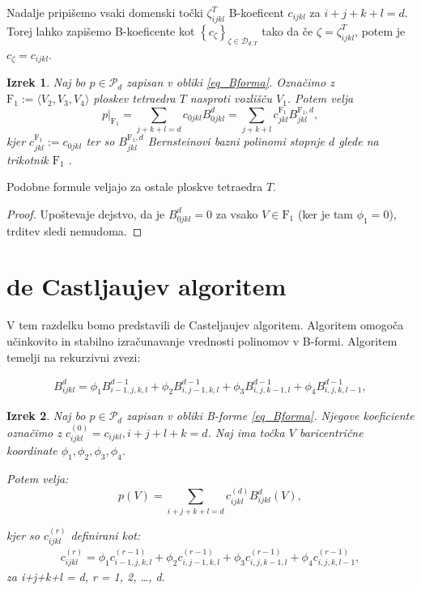 \documentclass[11pt,a4paper]{article}
\newtheorem{theorem}{Izrek}
\begin{document}
Nadalje pripišemo vsaki domenski točki $\zeta_{ijkl}^T$ B-koeficent
$c_{ijkl}$ za $i +j+k+l = d$. Torej lahko zapišemo B-koeficente kot $\left\{
    c_{\zeta}
\right\}_{\zeta \in \mathcal{D}_{d,T}}$ tako da če $\zeta = \zeta_{ijkl}^T$,
potem je $c_{\zeta} = c_{ijkl}$.

\begin{theorem}
    Naj bo $p \in \mathcal{P}_d$ zapisan v obliki \eqref{eq_Bforma}. Označimo 
    z $\text{F}_1 := \langle V_2,V_3,V_4 \rangle$ ploskev tetraedra $T$ nasproti vozlišču $V_1$.
    Potem velja 
    \begin{equation}
        p|_{\text{F}_1} = \sum_{j+k+l = d} c_{0jkl}B_{0jkl}^d = 
            \sum_{j+k+l}c_{jkl}^{\text{F}_1} B_{jkl}^{\text{F}_1,d},
    \end{equation}
    kjer $c_{jkl}^{\text{F}_1}:=c_{0jkl}$ ter so $B_{jkl}^{\text{F}_1,d}$
    Bernsteinovi bazni polinomi stopnje $d$ glede na trikotnik $\text{F}_1$ .
\end{theorem}

Podobne formule veljajo za ostale ploskve tetraedra $T$.

\begin{proof}
    Upoštevaje dejstvo, da je $B_{0jkl}^d = 0$ za vsako $V \in \text{F}_1$ (ker je 
    tam $\phi_1 = 0$), trditev sledi nemudoma.
\end{proof}

\section{de Castljaujev algoritem}

V tem razdelku bomo predstavili de Casteljaujev algoritem. Algoritem omogoča učinkovito in stabilno izračunavanje vrednosti polinomov v B-formi. Algoritem temelji na rekurzivni zvezi:

\begin{align*}
 B_{ijkl}^d = \phi_1 B_{i-1,j,k,l}^{d-1} + \phi_2 B_{i,j-1,k,l}^{d-1} + \phi_3 B_{i,j,k-1,l}^{d-1} + \phi_4 B_{i,j,k,l-1}^{d-1}, 
\end{align*}

\begin{theorem}
    Naj bo $p \in \mathcal{P}_d$ zapisan v obliki B-forme \eqref{eq_Bforma}. Njegove koeficiente označimo z $c_{ijkl}^{(0)} = c_{ijkl}, i+j+l+k = d$.
    Naj ima točka $V$ baricentrične koordinate $\phi_1, \phi_2, \phi_3, \phi_4$.

    Potem velja:
    $$
    p(V) = \sum_{i+j+k+l = d} c_{ijkl}^{(d)} B_{ijkl}^d(V),
    $$

    kjer so  $c_{ijkl}^{(r)}$ definirani kot:
    \begin{align*}
        c_{ijkl}^{(r)} = \phi_1 c_{i-1,j,k,l}^{(r-1)} + \phi_2 c_{i,j-1,k,l}^{(r-1)} + \phi_3 c_{i,j,k-1,l}^{(r-1)} + \phi_4 c_{i,j,k,l-1}^{(r-1)},
    \end{align*}
    za i+j+k+l = d, r = 1, 2, \ldots, d.
\end{theorem}
\end{document}
